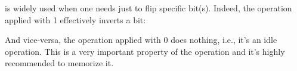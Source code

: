 ﻿\XOR is widely used when one needs just to flip specific bit(s).
Indeed, the \XOR operation applied with 1 effectively inverts a bit:



And vice-versa, the \XOR operation applied with 0 does nothing, i.e., it's an idle operation.
This is a very important property of the \XOR operation and it's highly recommended to memorize it.

